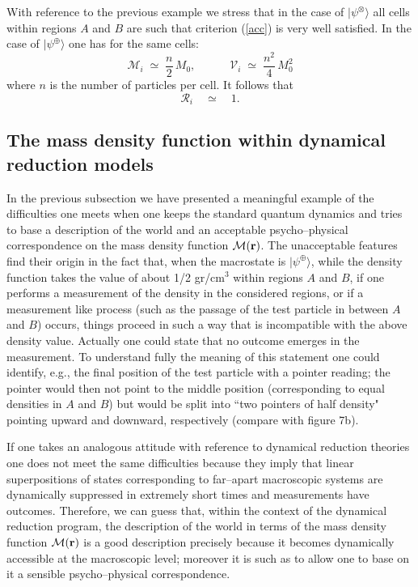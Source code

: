 \documentclass[12pt]{article}
\begin{document}
With reference to the previous example we stress that in the case
of $|\psi^{\otimes}\rangle$ all cells within regions $A$ and $B$
are such that criterion (\ref{acc}) is very well satisfied. In the
case of $|\psi^{\oplus}\rangle$ one has for the same cells:
\begin{equation}
{\mathcal M}_{i} \; \simeq \; \frac{n}{2}\,M_{0}, \quad\qquad
{\mathcal V}_{i} \; \simeq \; \frac{n^{2}}{4}\, M_{0}^{2}
\end{equation}
where $n$ is the number of particles per cell. It follows that
\begin{equation} {\mathcal R}_{i} \quad \simeq \quad 1.
\end{equation}

\subsection{The mass density function within dynamical reduction
models} \label{sec123}

In the previous subsection we have presented a meaningful example
of the difficulties one meets when one keeps the standard quantum
dynamics and tries to base a description of the world and an
acceptable psycho--physical correspondence on the mass density
function ${\mathcal M}({\bf r})$. The unacceptable features find
their origin in the fact that, when the macrostate is
$|\psi^{\oplus}\rangle$, while the density function takes the
value of about 1/2 gr/cm$^{3}$ within regions $A$ and $B$, if one
performs a measurement of the density in the considered regions,
or if a measurement like process (such as the passage of the test
particle in between $A$ and $B$) occurs, things proceed in such a
way that is incompatible with the above density value. Actually
one could state that no outcome emerges in the measurement. To
understand fully the meaning of this statement one could identify,
e.g., the final position of the test particle with a pointer
reading; the pointer would then not point to the middle position
(corresponding to equal densities in $A$ and $B$) but would be
split into ``two pointers of half density" pointing upward and
downward, respectively (compare with figure 7b).

If one takes an analogous attitude with reference to dynamical
reduction theories one does not meet the same difficulties because
they imply that linear superpositions of states corresponding to
far--apart macroscopic systems are dynamically suppressed in
extremely short times and measurements have outcomes. Therefore,
we can guess that, within the context of the dynamical reduction
program, the description of the world in terms of the mass density
function ${\mathcal M}({\bf r})$ is a good description precisely
because it becomes dynamically accessible at the macroscopic
level; moreover it is such as to allow one to base on it a
sensible psycho--physical correspondence.
\end{document}

